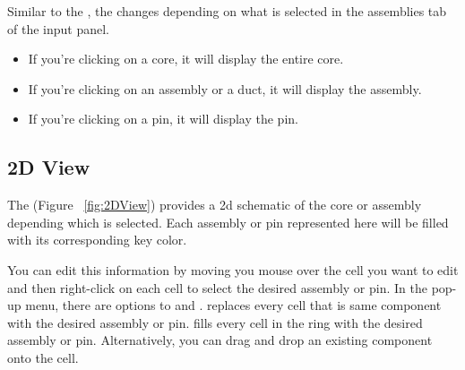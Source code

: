 Similar to the , the  changes depending on what is selected in the assemblies tab of the input panel.

\begin{itemize}
	\item{If you're clicking on a core, it will display the entire core.}
	\item{If you're clicking on an assembly or a duct, it will display the assembly.}
	\item{If you're clicking on a pin, it will display the pin.}
\end{itemize}

\subsection{2D View}
The  (Figure ~\ref{fig:2DView}) provides a 2d schematic of the core or assembly depending which is selected. Each assembly or pin represented here will be filled with its corresponding key color.

You can edit this information by moving you mouse over the cell you want to edit and then right-click on each cell to select the desired assembly or pin.  In the pop-up menu, there are options to  and .  replaces every cell that is same component with the desired assembly or pin.   fills every cell in the ring with the desired assembly or pin.  Alternatively, you can drag and drop an existing component onto the cell.

